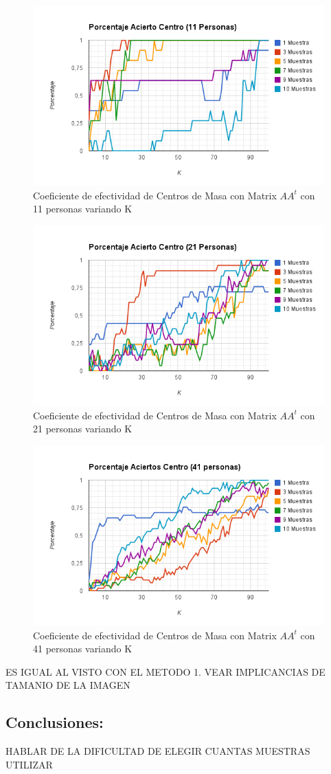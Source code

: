 \begin{figure}[H]
\includegraphics[width=1\textwidth]{img/imagef13.png}
     \caption{Coeficiente de efectividad de Centros de Masa con Matrix $AA^t$ con 11 personas variando K}
\end{figure}

\begin{figure}[H]
\includegraphics[width=1\textwidth]{img/imagef14.png}
     \caption{Coeficiente de efectividad de Centros de Masa con Matrix $AA^t$ con 21 personas variando K}
\end{figure}

\begin{figure}[H]
\includegraphics[width=1\textwidth]{img/imagef15.png}
     \caption{Coeficiente de efectividad de Centros de Masa  con Matrix $AA^t$ con 41 personas variando K}
\end{figure}


ES IGUAL AL VISTO CON EL METODO 1. VEAR IMPLICANCIAS DE TAMANIO DE LA IMAGEN

\subsection{Conclusiones:}

HABLAR DE LA DIFICULTAD DE ELEGIR CUANTAS MUESTRAS UTILIZAR
